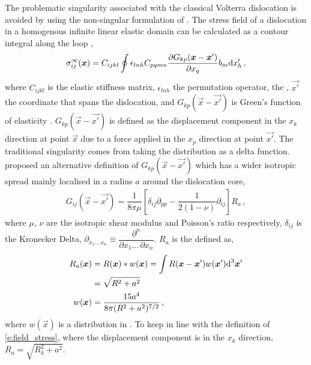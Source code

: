 		The problematic singularity associated with the classical Volterra dislocation is avoided by using the non-singular formulation of \citet{a_non-singular_continuum_theory_of_dislocations}. The stress field of a dislocation in a homogenous infinite linear elastic domain can be calculated as a contour integral along the loop \cite{mura_t},
		\begin{align}\label{e:field_stress}
			\sigma_{ij}^{\infty}(\vec{x}) = C_{ijkl} \oint \epsilon_{lnh} C_{pqmn} \dfrac{\partial G_{kp}(\vec{x} - \vec{x'})}{\partial x_{q}} b_{m} \rvar{d}x'_{h}\,,
		\end{align}
		where $ C_{ijkl} $ is the elastic stiffness matrix, $ \epsilon_{lnh} $ the permutation operator,  the , $ \vec{x'} $ the coordinate that spans the dislocation, and $ G_{kp}(\vec{x} - \vec{x'}) $ is Green's function of elasticity \cite{mura_t}. $ G_{kp}(\vec{x} - \vec{x'}) $ is defined as the displacement component in the $ x_{k} $ direction at point $ \vec{x} $ due to a force applied in the $ x_{p} $ direction at point $ \vec{x'} $. The traditional singularity comes from taking the  distribution as a delta function. \citet{a_non-singular_continuum_theory_of_dislocations} proposed an alternative definition of $ G_{kp}(\vec{x} - \vec{x'}) $ which has a wider isotropic spread mainly localised in a radius $ a $ around the dislocation core,
		\begin{align}\label{e:elastic_green_func}
			G_{ij}(\vec{x} - \vec{x'}) = \dfrac{1}{8\pi \mu}\left[ \delta_{ij} \partial_{pp} - \dfrac{1}{2(1-\nu)} \partial_{ij} \right] R_{a}\,,
		\end{align}
		where $ \mu $, $ \nu $ are the isotropic shear modulus and Poisson's ratio respectively, $ \delta_{ij} $ is the Kronecker Delta, $ \partial_{x_{1} \ldots\, x_{n}} \equiv \dfrac{\partial^{n}}{\partial x_{1} \ldots\, \partial x_{n}}$. $ R_{a} $ is the defined as,
		\begin{subequations}
			\begin{align}\label{e:ra}
				R_{a}(\vec{x}) &= R(\vec{x}) * w(\vec{x}) = \int R(\vec{x} - \vec{x'}) w(\vec{x'}) \rvar{d}^{3}\vec{x'}\nn
							   &= \sqrt{R^{2} + a^{2}}\\
				w(\vec{x}) 	   &= \dfrac{15 a^{4}}{8\pi (R^{2} + a^{2})^{7/2}}\,,
			\end{align}
		\end{subequations}
		 where $ w(\vec{x}) $ is a  distribution in \cite{a_non-singular_continuum_theory_of_dislocations}. To keep in line with the definition of \cref{e:field_stress}, where the displacement component is in the $ x_{k} $ direction, $ R_{a} = \sqrt{R_{k}^{2} + a^{2}} $.
		 
